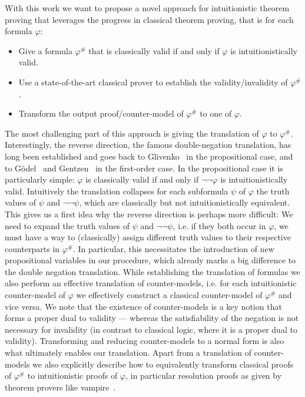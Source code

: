 \documentclass[a4paper,11pt]{report}
\theoremstyle{definition}
\theoremstyle{definition}
\theoremstyle{definition}
\theoremstyle{definition}
\theoremstyle{definition}
\theoremstyle{definition}
\theoremstyle{definition}
\begin{document}
	With this work we want to propose a novel approach for intuitionistic theorem proving that leverages the progress in classical theorem proving, that is for each formula $\varphi$:
	\begin{itemize}
		\item Give a formula $\varphi^\#$ that is classically valid if and only if $\varphi$ is intuitionistically valid.
		\item Use a state-of-the-art classical prover to establish the validity/invalidity of $\varphi^\#$.
		\item Transform the output proof/counter-model of $\varphi^\#$ to one of $\varphi$.
	\end{itemize}
	The most challenging part of this approach is giving the translation of $\varphi$ to $\varphi^\#$.
	Interestingly, the reverse direction, the famous double-negation translation, has long been established and goes back to Glivenko~\cite{glivenko1929quelques} in the propositional case, and to G\"odel~\cite{godel1933intuitionistischen} and Gentzen~\cite{gentzen1936widerspruchsfreiheit} in the first-order case. In the propositional case it is particularly simple: $\varphi$ is classically valid if and only if $\neg\neg\varphi$ is intuitionistically valid. Intuitively the translation collapses for each subformula $\psi$ of $\varphi$ the truth values of $\psi$ and $\neg\neg\psi$, which are classically but not intuitionistically equivalent. This gives us a first idea why the reverse direction is perhaps more difficult: We need to expand the truth values of $\psi$ and $\neg\neg\psi$, i.e. if they both occur in $\varphi$, we must have a way to (classically) assign different truth values to their respective counterparts in $\varphi^\#$. In particular, this necessitates the introduction of new propositional variables in our procedure, which already marks a big difference to the double negation translation.
	While establishing the translation of formulas we also perform an effective translation of counter-models, i.e. for each intuitionistic counter-model of $\varphi$ we effectively construct a classical counter-model of $\varphi^\#$ and vice versa.
	We note that the existence of counter-models is a key notion that forms a proper dual to validity --- whereas the satisfiability of the negation is not necessary for invalidity (in contrast to classical logic, where it is a proper dual to validity).
	Transforming and reducing counter-models to a normal form is also what ultimately enables our translation. Apart from a translation of counter-models we also explicitly describe how to equivalently transform classical proofs of $\varphi^\#$ to intuitionistic proofs of $\varphi$, in particular resolution proofs as given by theorem provers like vampire~\cite{Kov_cs_2013}.
	
\end{document}
